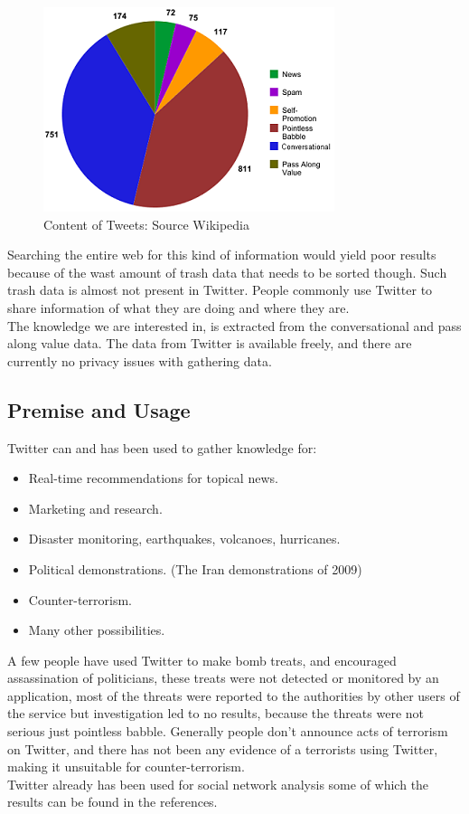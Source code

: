 \documentclass[]{article}  %
\begin{document}
\begin{figure}[h]
\centering
\includegraphics[scale=1]{Content_of_Tweets_Graphed.png}
\caption{Content of Tweets: Source Wikipedia}
\label{figContent}
\end{figure} 
Searching the entire web for this kind of information would yield poor results because of the wast amount of trash data that needs to be sorted though. Such trash data is almost not present in Twitter. People commonly use Twitter to share information of what they are doing and where they are. \\ The knowledge we are interested in, is extracted from the conversational and pass along value data. The data from Twitter is available freely, and there are currently no privacy issues with gathering data.

\subsection{Premise and Usage}
Twitter can and has been used to gather knowledge for:

\begin{itemize}
	\item Real-time recommendations for topical news. \cite{bib5}
	\item Marketing and research.
	\item Disaster monitoring, earthquakes, volcanoes, hurricanes. \cite{bib7}
	\item Political demonstrations. (The Iran demonstrations of 2009)
	\item Counter-terrorism.
	\item Many other possibilities.
\end{itemize}

A few people have used Twitter to make bomb treats, and encouraged assassination of politicians, these treats were not detected or monitored by an application, most of the threats were reported to the authorities by other users of the service but investigation  led to no results, because the threats were not serious just pointless babble. Generally people don't announce acts of terrorism on Twitter, and there has not been any evidence of a terrorists using Twitter, making it unsuitable for counter-terrorism. \\ Twitter already has been used for social network analysis some of which the results can be found in the references.
\end{document}
